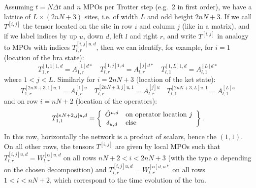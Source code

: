 Assuming $t=N\Delta t$ and $n$ MPOs per Trotter step (e.g.\ 2 in first order), we have a lattice of $L \times (2nN+3)$ sites, i.e. of width $L$ and odd height $2nN+3$. If we call $T^{[i,j]}$ the tensor located on the site in row $i$ and column $j$ (like in a matrix), and if we label indices by up $u$, down $d$, left $l$ and right $r$, and write $T^{[i,j]}$ in analogy to MPOs with indices $T^{[i,j]u,d}_{l,r}$, then we can identify, for example, for $i=1$ (location of the bra state):
\begin{equation}
T^{[1,1] 1,d}_{1,r} = A^{[1]d*}_{1,r} \quad
T^{[1,j] 1,d}_{l,r} = A^{[j]d*}_{l,r} \quad
T^{[1,L] 1,d}_{l,1} = A^{[L]d*}_{l,1}
\end{equation}
where $1<j<L$. Similarly for $i=2nN+3$ (location of the ket state):
\begin{equation}
T^{[2nN+3,1] u,1}_{1,r} = A^{[1]u}_{1,r} \quad
T^{[2nN+3,j] u,1}_{l,r} = A^{[j]u}_{l,r} \quad
T^{[2nN+3,L] u,1}_{l,1} = A^{[L]u}_{l,1}
\end{equation}
and on row $i=nN+2$ (location of the operators):
\begin{equation}
T^{[nN+2,j] u,d}_{1,1} = \left\{ \begin{array}{cl} \hat{O}^{u,d} & {\rm on\ operator\ location\ } j \\
\delta_{u,d} & {\rm else} \end{array} \right\} .
\end{equation}
In this row, horizontally the network is a product of scalars, hence the $(1,1)$. On all other rows, the tensors $T^{[i,j]}$ are given by local MPOs such that $T^{[i,j]u,d}_{l,r}= W^{[\alpha]u,d}_{l,r}$ on all rows $nN+2 < i < 2nN+3$ (with the type $\alpha$ depending on the chosen decomposition) and 
$T^{[i,j]u,d}_{l,r}= W^{[\alpha]d,u*}_{l,r}$ on all rows $1 < i < nN+2$, which correspond to the time evolution of the bra.

